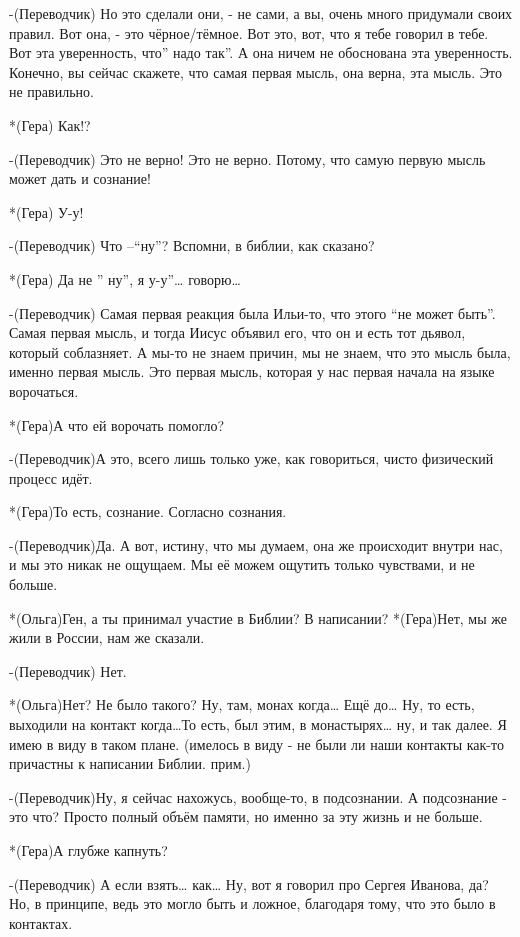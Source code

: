 -(Переводчик) Но это сделали они, - не сами, а вы, очень много придумали своих правил. Вот она, - это чёрное/тёмное. Вот это, вот, что я тебе говорил в тебе. Вот эта уверенность, что” надо так”. А она ничем не обоснована эта уверенность. Конечно, вы сейчас скажете, что самая первая мысль, она верна, эта мысль. Это не правильно.

*(Гера) Как!?

-(Переводчик) Это не верно! Это не верно. Потому, что самую первую мысль может дать и сознание!

*(Гера) У-у! 

-(Переводчик) Что –“ну”? Вспомни, в библии, как сказано? 

*(Гера) Да не ” ну”,  я  у-у”… говорю…

-(Переводчик) Самая первая реакция была Ильи-то, что этого “не может быть”. Самая первая мысль, и тогда Иисус объявил его, что он и есть тот дьявол, который соблазняет. А мы-то не знаем причин, мы не знаем, что это мысль была, именно первая мысль.  Это первая мысль, которая у нас первая начала на языке ворочаться. 

*(Гера)А что ей ворочать помогло?

-(Переводчик)А это, всего лишь только уже, как говориться, чисто физический процесс идёт.

*(Гера)То есть, сознание. Согласно сознания.

-(Переводчик)Да. А вот, истину, что мы думаем, она же происходит внутри нас, и мы это никак не ощущаем. Мы её можем ощутить только чувствами, и не больше.

*(Ольга)Ген, а ты принимал участие в Библии? В написании?
*(Гера)Нет, мы же жили в России, нам же сказали.

-(Переводчик) Нет.

*(Ольга)Нет? Не было такого? Ну, там, монах когда… Ещё до… Ну, то есть, выходили на контакт когда…То есть, был этим, в монастырях… ну, и так далее. Я имею в виду в таком плане. (имелось в виду - не были ли наши контакты как-то причастны к написании Библии. прим.)

-(Переводчик)Ну, я сейчас нахожусь, вообще-то, в подсознании. А подсознание - это что? Просто полный объём памяти, но именно за эту жизнь и не больше.

*(Гера)А глубже капнуть?

-(Переводчик) А если взять… как… Ну, вот я говорил про Сергея Иванова, да? Но, в принципе, ведь это могло быть и ложное, благодаря тому, что это было в контактах.

